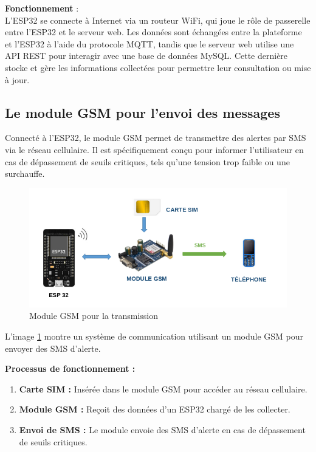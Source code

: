 \textbf{Fonctionnement} : \\
L'ESP32 se connecte à Internet via un routeur WiFi, qui joue le rôle de passerelle entre l'ESP32 et le serveur web. Les données sont échangées entre la plateforme et l'ESP32 à l'aide du protocole MQTT, tandis que le serveur web utilise une API REST pour interagir avec une base de données MySQL. Cette dernière stocke et gère les informations collectées pour permettre leur consultation ou mise à jour.


\subsection{Le module GSM pour l'envoi des messages}
Connecté à l'ESP32, le module GSM permet de transmettre des alertes par SMS via le réseau cellulaire. Il est spécifiquement conçu pour informer l'utilisateur en cas de dépassement de seuils critiques, tels qu'une tension trop faible ou une surchauffe.\\

\begin{figure}[H]
	\centering
	\includegraphics[width=15cm]{./img/composants/espGSM1.png}
	\caption{Module GSM pour la transmission}
	\label{fig:moduleGSM}
\end{figure}

L'image \ref{fig:moduleGSM} montre un système de communication utilisant un module GSM pour envoyer des SMS d'alerte.

\textbf{Processus de fonctionnement :}
\begin{enumerate}
	\item \textbf{Carte SIM :} Insérée dans le module GSM pour accéder au réseau cellulaire.
	\item \textbf{Module GSM :} Reçoit des données d'un ESP32 chargé de les collecter.
	\item \textbf{Envoi de SMS :} Le module envoie des SMS d'alerte en cas de dépassement de seuils critiques.
\end{enumerate}

